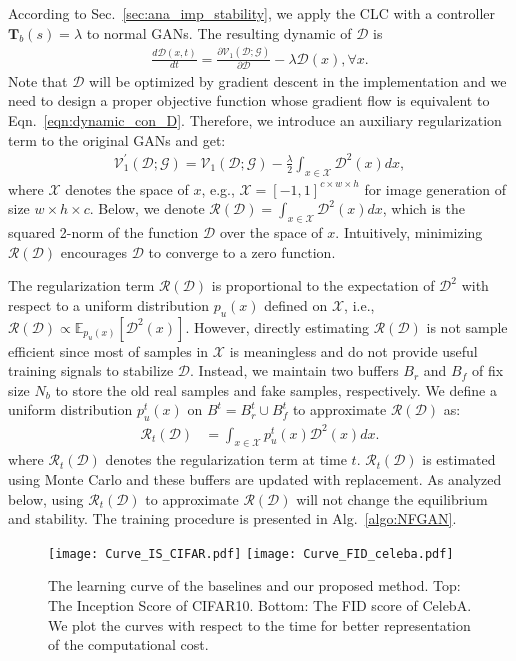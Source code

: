 \documentclass{article}
\newcommand{\ep}{\mathbb{E}}
\newcommand{\xG}{\mathcal{G}}
\newcommand{\xD}{\mathcal{D}}
\newcommand{\uV}{\mathcal{V}}
\newcommand{\uR}{\mathcal{R}}
\newcommand{\fT}{\bm{T}}
\newcommand{\eqn}[1]{Eqn.~\eqref{eqn:#1}}
\newcommand{\secref}[1]{Sec.~\ref{sec:#1}} \usepackage{wrapfig}
\theoremstyle{definition}
\begin{document}
According to \secref{ana_imp_stability}, we apply the CLC with a controller $\fT_b(s)=\lambda$ to normal GANs. 
The resulting dynamic of $\xD$ is
\begin{align}
\frac{d\xD(x, t)}{dt} = \frac{\partial \uV_1(\xD; \xG)}{\partial \xD} - \lambda \xD(x), \forall x.\label{eqn:dynamic_con_D}
\end{align}
Note that $\xD$ will be optimized by gradient descent in the implementation and we need to design a proper objective function whose gradient flow is equivalent to \eqn{dynamic_con_D}.
Therefore, we introduce an auxiliary regularization term to the original GANs and get:
\begin{align}
\uV_1^\prime(\xD; \xG) = \uV_1(\xD; \xG) - \frac{\lambda}{2}\int_{x\in \mathcal{X}} \xD^2(x)dx,
\end{align}
where $\mathcal{X}$ denotes the space of $x$, e.g., $\mathcal{X} = [-1, 1]^{c\times w\times h}$ for image generation of size $w\times h \times c$.
Below, we denote $\uR(\xD) = \int_{x\in\mathcal{X}} \xD^2(x)dx$, which is the squared 2-norm of the function $\xD$ over the space of $x$. Intuitively, minimizing $\uR(\xD)$ encourages $\xD$ to converge to a zero function.


The regularization term $\uR(\xD)$ is proportional to the expectation of $\xD^2$ with respect to a uniform distribution $p_u(x)$ defined on $\mathcal{X}$, i.e., $\uR(\xD) \propto \ep_{p_u(x)}[\xD^2(x)]$.
However, directly estimating $\uR(\xD)$ is not sample efficient since most of samples in $\mathcal{X}$ is meaningless and do not provide useful training signals to stabilize $\xD$.
Instead, we maintain two buffers $B_r$ and $B_f$ of fix size $N_b$ to store the old real samples and fake samples, respectively. We define a uniform distribution $p_u^t(x)$ on $B^t=B_r^t\cup B_f^t$ to approximate $\uR(\xD)$ as:
\begin{align}
\uR_t(\xD) &= \int_{x\in\mathcal{X}} p_u^t(x)\xD^2(x)dx. \label{eqn:clc_regularization}
\end{align}
where $\uR_t(\xD)$ denotes the regularization term at time $t$.
$\uR_t(\xD)$ is estimated using Monte Carlo and these buffers are updated with replacement. As analyzed below, using $\uR_t(\xD)$ to approximate $\uR(\xD)$ will not change the equilibrium and stability.
The training procedure is presented in Alg.~\ref{algo:NFGAN}.



\begin{figure}[t]
\centering
	\texttt{[image: Curve\_IS\_CIFAR.pdf]}
\texttt{[image: Curve\_FID\_celeba.pdf]}
\caption{The learning curve of the baselines and our proposed method. Top: The Inception Score of CIFAR10. Bottom: The FID score of CelebA. We plot the curves with respect to the time for better representation of the computational cost.}
	\label{fig:learning_curve}
\end{figure}
\end{document}
